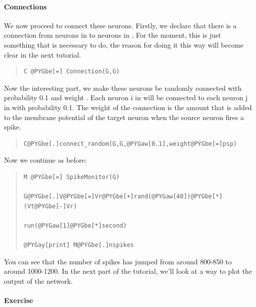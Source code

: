\documentclass[letterpaper,10pt]{manual}
\begin{document}
\paragraph{Connections}

We now proceed to connect these neurons. Firstly, we declare
that there is a connection from neurons in  to neurons in .
For the moment, this is just something that is necessary to
do, the reason for doing it this way will become clear in the
next tutorial.
\begin{quote}

\begin{Verbatim}[commandchars=@\[\]]
C @PYGbe[=] Connection(G,G)
\end{Verbatim}
\end{quote}

Now the interesting part, we make these neurons be randomly
connected with probability 0.1 and weight . Each neuron
i in  will be connected to each neuron j in 
with probability 0.1. The weight of the connection is the
amount that is added to the membrane potential of the target
neuron when the source neuron fires a spike.
\begin{quote}

\begin{Verbatim}[commandchars=@\[\]]
C@PYGbe[.]connect_random(G,G,@PYGaw[0.1],weight@PYGbe[=]psp)
\end{Verbatim}
\end{quote}

Now we continue as before:
\begin{quote}

\begin{Verbatim}[commandchars=@\[\]]
M @PYGbe[=] SpikeMonitor(G)

G@PYGbe[.]V@PYGbe[=]Vr@PYGbe[+]rand(@PYGaw[40])@PYGbe[*](Vt@PYGbe[-]Vr)

run(@PYGaw[1]@PYGbe[*]second)

@PYGay[print] M@PYGbe[.]nspikes
\end{Verbatim}
\end{quote}

You can see that the number of spikes has jumped from around
800-850 to around 1000-1200. In the next part of the tutorial,
we'll look at a way to plot the output of the network.


\paragraph{Exercise}
\end{document}
